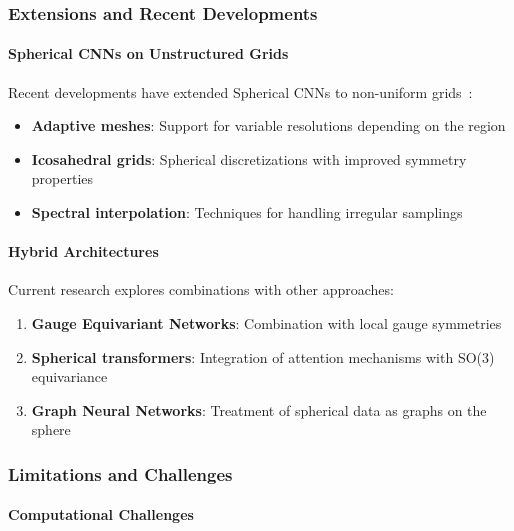 \subsubsection{Extensions and Recent Developments}

\paragraph{Spherical CNNs on Unstructured Grids}

Recent developments have extended Spherical CNNs to non-uniform grids~\citep{cohen2021spherical}:

\begin{itemize}
    \item \textbf{Adaptive meshes}: Support for variable resolutions depending on the region
    \item \textbf{Icosahedral grids}: Spherical discretizations with improved symmetry properties
    \item \textbf{Spectral interpolation}: Techniques for handling irregular samplings
\end{itemize}

\paragraph{Hybrid Architectures}

Current research explores combinations with other approaches:

\begin{enumerate}
    \item \textbf{Gauge Equivariant Networks}: Combination with local gauge symmetries~\citep{cohen2019gaugeequivariantconvolutional}
    \item \textbf{Spherical transformers}: Integration of attention mechanisms with SO(3) equivariance
    \item \textbf{Graph Neural Networks}: Treatment of spherical data as graphs on the sphere
\end{enumerate}

\subsubsection{Limitations and Challenges}

\paragraph{Computational Challenges}

